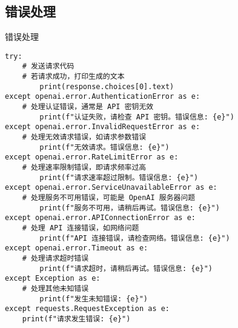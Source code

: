 \subsection{错误处理}
\begin{frame}{错误处理}
        \begin{lstlisting}[style=pythonstyle]
try:
    # 发送请求代码
    # 若请求成功，打印生成的文本
        print(response.choices[0].text)
except openai.error.AuthenticationError as e:
    # 处理认证错误，通常是 API 密钥无效
        print(f"认证失败，请检查 API 密钥。错误信息: {e}")
except openai.error.InvalidRequestError as e:
    # 处理无效请求错误，如请求参数错误
        print(f"无效请求。错误信息: {e}")
except openai.error.RateLimitError as e:
    # 处理速率限制错误，即请求频率过高
        print(f"请求速率超过限制。错误信息: {e}")
except openai.error.ServiceUnavailableError as e:
    # 处理服务不可用错误，可能是 OpenAI 服务器问题
        print(f"服务不可用，请稍后再试。错误信息: {e}")
except openai.error.APIConnectionError as e:
    # 处理 API 连接错误，如网络问题
        print(f"API 连接错误，请检查网络。错误信息: {e}")
except openai.error.Timeout as e:
    # 处理请求超时错误
        print(f"请求超时，请稍后再试。错误信息: {e}")
except Exception as e:
    # 处理其他未知错误
        print(f"发生未知错误: {e}")
except requests.RequestException as e:
    print(f"请求发生错误: {e}")
        \end{lstlisting}
\end{frame}

